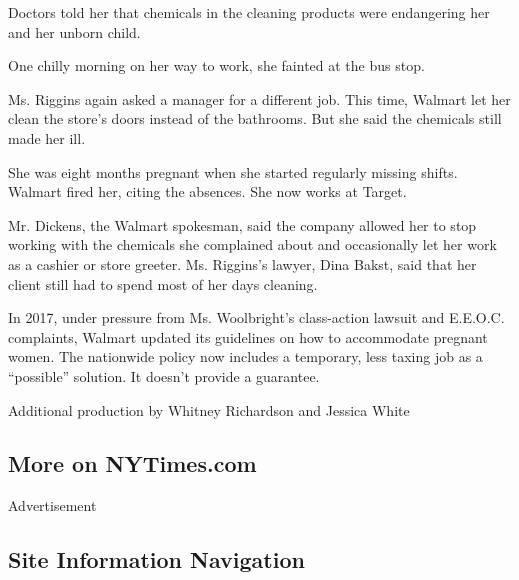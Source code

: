 Doctors told her that chemicals in the cleaning products were
endangering her and her unborn child.

One chilly morning on her way to work, she fainted at the bus stop.

Ms. Riggins again asked a manager for a different job. This time,
Walmart let her clean the store's doors instead of the bathrooms. But
she said the chemicals still made her ill.

She was eight months pregnant when she started regularly missing shifts.
Walmart fired her, citing the absences. She now works at Target.

Mr. Dickens, the Walmart spokesman, said the company allowed her to stop
working with the chemicals she complained about and occasionally let her
work as a cashier or store greeter. Ms. Riggins's lawyer, Dina Bakst,
said that her client still had to spend most of her days cleaning.

In 2017, under pressure from Ms. Woolbright's class-action lawsuit and
E.E.O.C. complaints, Walmart updated its guidelines on how to
accommodate pregnant women. The nationwide policy now includes a
temporary, less taxing job as a ``possible'' solution. It doesn't
provide a guarantee.

Additional production by Whitney Richardson and Jessica White

\hypertarget{more-on-nytimescom}{%
\subsection{More on NYTimes.com}\label{more-on-nytimescom}}

Advertisement

\hypertarget{site-information-navigation}{%
\subsection{Site Information
Navigation}\label{site-information-navigation}}


